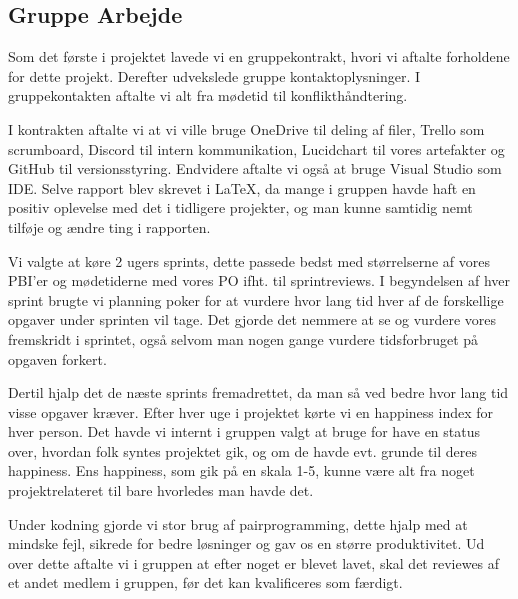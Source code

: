 \subsection{Gruppe Arbejde}
Som det første i projektet lavede vi en gruppekontrakt, 
hvori vi aftalte forholdene for dette projekt. Derefter udvekslede gruppe kontaktoplysninger.
I gruppekontakten aftalte vi alt fra mødetid til konflikthåndtering.


I kontrakten aftalte vi at vi ville bruge OneDrive til deling af filer, Trello som scrumboard, Discord til intern kommunikation, Lucidchart til vores artefakter og GitHub til versionsstyring. 
Endvidere aftalte vi også
at bruge Visual Studio som IDE.
Selve rapport blev skrevet i \LaTeX, da mange i gruppen havde haft en positiv oplevelse med det i tidligere projekter, og man kunne samtidig nemt tilføje og ændre ting i rapporten.

Vi valgte at køre 2 ugers sprints, dette passede bedst med størrelserne af vores PBI'er og mødetiderne med vores PO ifht. til sprintreviews.
I begyndelsen af hver sprint brugte vi planning poker for at vurdere hvor lang tid hver af de forskellige opgaver under sprinten vil tage.
Det gjorde det nemmere at se og vurdere vores fremskridt i sprintet, også selvom man nogen gange vurdere tidsforbruget på opgaven forkert.

Dertil hjalp det de næste sprints fremadrettet, da man så ved bedre hvor lang tid visse opgaver kræver.
Efter hver uge i projektet kørte vi en happiness index for hver person.
Det havde vi internt i gruppen valgt
at bruge for have en status over, hvordan folk syntes projektet gik, og om de havde evt. grunde til deres happiness.
Ens happiness, som gik på en skala 1-5, kunne være alt fra noget projektrelateret til bare hvorledes man havde det.

Under kodning gjorde vi stor brug af pairprogramming, dette hjalp med at mindske fejl, sikrede for bedre løsninger og gav os en større produktivitet.
Ud over dette aftalte vi i gruppen at efter noget er blevet lavet, 
skal det reviewes af et andet medlem i gruppen, før det kan kvalificeres som færdigt.

